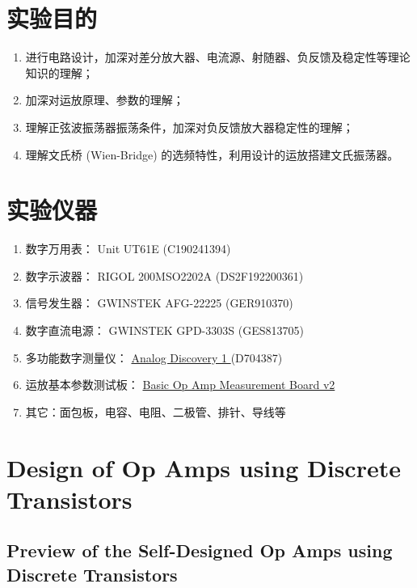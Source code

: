 \documentclass[UTF8]{article}
\begin{document}
\newpage
\section{实验目的}

\begin{enumerate}
    \item 进行电路设计，加深对差分放大器、电流源、射随器、负反馈及稳定性等理论知识的理解；
    \item 加深对运放原理、参数的理解；
    \item 理解正弦波振荡器振荡条件，加深对负反馈放大器稳定性的理解；
    \item 理解文氏桥 (Wien-Bridge) 的选频特性，利用设计的运放搭建文氏振荡器。
\end{enumerate}

\section{实验仪器}

\begin{enumerate}
    \item 数字万用表： Unit UT61E (C190241394)
    \item 数字示波器： RIGOL 200MSO2202A (DS2F192200361)
    \item 信号发生器： GWINSTEK AFG-22225 (GER910370)
    \item 数字直流电源： GWINSTEK GPD-3303S (GES813705)
    \item 多功能数字测量仪： 
    \href{https://digilent.com/reference/test-and-measurement/analog-discovery/start
    }{ %
    Analog Discovery 1
    } 
    (D704387)
    \item 运放基本参数测试板：%
    \href{https://yidingg.github.io/YiDingg/\#/ElectronicDesigns/Basic\%20Op\%20Amp\%20Measurement\%20Board\%20v2
    }{ %
    Basic Op Amp Measurement Board v2
    }
    \item 其它：面包板，电容、电阻、二极管、排针、导线等
\end{enumerate}

\section{Design of Op Amps using Discrete Transistors}

\subsection{Preview of the Self-Designed Op Amps using Discrete Transistors}
\end{document}
